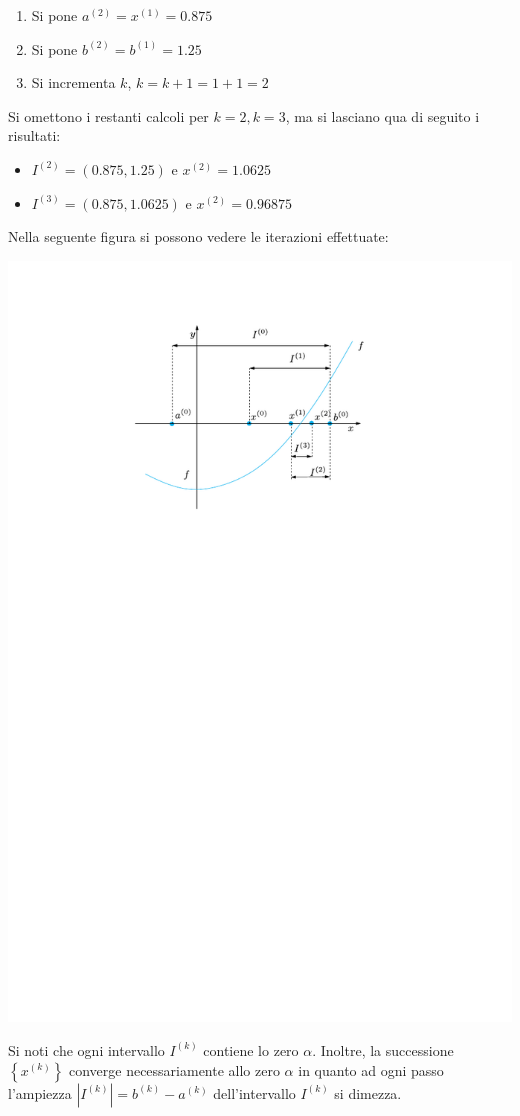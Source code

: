 \documentclass[a4paper]{article}
\begin{document}
\begin{examplebox}
\begin{enumerate}
\begin{enumerate}
                \item Si pone $a^{(2)} = x^{(1)} = 0.875$

                \item Si pone $b^{(2)} = b^{(1)} = 1.25$

                \item Si incrementa $k$, $k = k + 1 = 1 + 1 = 2$
            \end{enumerate}
        \end{enumerate}
        Si omettono i restanti calcoli per $k=2, k=3$, ma si lasciano qua di seguito i risultati:
        \begin{itemize}
            \item $I^{(2)} = \left(0.875, 1.25\right)$ e $x^{(2)} = 1.0625$
            \item $I^{(3)} = \left(0.875, 1.0625\right)$ e $x^{(2)} = 0.96875$
        \end{itemize}

        \newpage

        \noindent
        Nella seguente figura si possono vedere le iterazioni effettuate:
        \begin{center}
            \includegraphics[width=.7\textwidth]{img/metodo-di-bisezione-1.pdf}
        \end{center}
        
        \noindent
        Si noti che ogni intervallo $I^{(k)}$ contiene lo zero $\alpha$. Inoltre, la successione $\left\{x^{(k)}\right\}$ converge necessariamente allo zero $\alpha$ in quanto ad ogni passo l'ampiezza $\left| I^{(k)} \right| = b^{(k)} - a^{(k)}$ dell'intervallo $I^{(k)}$ si dimezza.
    \end{examplebox}
\end{document}
